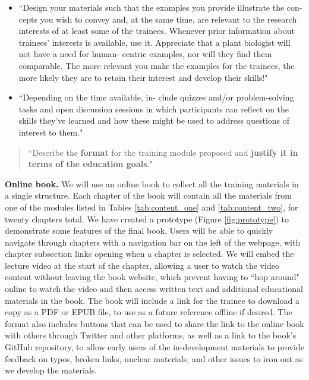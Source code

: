 \documentclass[pdftex,english,11pt,parskip=half]{scrartcl}
\begin{document}
\begin{itemize}
\item ``Design your materials such that the examples you provide illustrate the con- cepts you wish to convey and, at the same time, are relevant to the research interests of at least some of the trainees. Whenever prior information about trainees’ interests is available, use it. Appreciate that a plant biologist will not have a need for human- centric examples, nor will they find them comparable. The more relevant you make the examples for the trainees, the more likely they are to retain their interest and develop their skills!" \cite{via2011ten}
\item ``Depending on the time available, in- clude quizzes and/or problem-solving tasks and open discussion sessions in which participants can reflect on the skills they’ve learned and how these might be used to address questions of interest to them." \cite{via2011ten}
\end{itemize}

\begin{quotation} ``Describe the \textbf{format} for the training module
proposed and \textbf{justify it in terms of the education goals}."
\end{quotation}

\textbf{Online book.} We will use an online book to collect all the training
materials in a single structure. Each chapter of the book will contain all the
materials from one of the modules listed in Tables \ref{tab:content_one} and
\ref{tab:content_two}, for twenty chapters total. We have created a prototype
(Figure \ref{fig:prototype}) to demonstrate some features of the final book.
Users will be able to quickly navigate through chapters with a navigation bar on
the left of the webpage, with chapter subsection links opening when a chapter is
selected. We will embed the lecture video at the start of the chapter, allowing
a user to watch the video content without leaving the book website, which
prevent having to ``hop around" online to watch the video and then access
written text and additional educational materials in the book. The book will
include a link for the trainee to download a copy as a PDF or EPUB file, to use
as a future reference offline if desired. The format also includes buttons that
can be used to share the link to the online book with others through Twitter and
other platforms, as well as a link to the book's GitHub repository, to allow
early users of the in-development materials to provide feedback on typos, broken
links, unclear materials, and other issues to iron out as we develop the
materials. 
\end{document}
